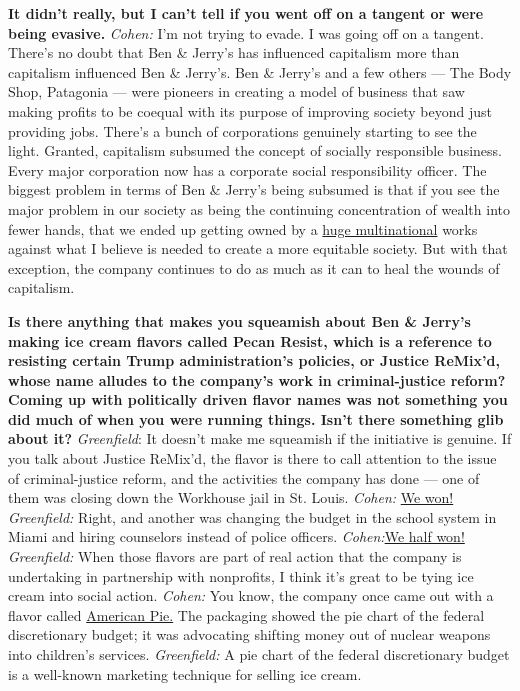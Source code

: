 \textbf{It didn't really, but I can't tell if you went off on a tangent
or were being evasive.} \emph{Cohen:} I'm not trying to evade. I was
going off on a tangent. There's no doubt that Ben \& Jerry's has
influenced capitalism more than capitalism influenced Ben \& Jerry's.
Ben \& Jerry's and a few others --- The Body Shop, Patagonia --- were
pioneers in creating a model of business that saw making profits to be
coequal with its purpose of improving society beyond just providing
jobs. There's a bunch of corporations genuinely starting to see the
light. Granted, capitalism subsumed the concept of socially responsible
business. Every major corporation now has a corporate social
responsibility officer. The biggest problem in terms of Ben \& Jerry's
being subsumed is that if you see the major problem in our society as
being the continuing concentration of wealth into fewer hands, that we
ended up getting owned by a \href{http://nytimes.com\#tooltip-2}{huge
multinational} works against what I believe is needed to create a more
equitable society. But with that exception, the company continues to do
as much as it can to heal the wounds of capitalism.

\textbf{Is there anything that makes you squeamish about Ben \& Jerry's
making ice cream flavors called Pecan Resist, which is a reference to
resisting certain Trump administration's policies, or Justice ReMix'd,
whose name alludes to the company's work in criminal-justice reform?
Coming up with politically driven flavor names was not something you did
much of when you were running things. Isn't there something glib about
it?} \emph{Greenfield}: It doesn't make me squeamish if the initiative
is genuine. If you talk about Justice ReMix'd, the flavor is there to
call attention to the issue of criminal-justice reform, and the
activities the company has done --- one of them was closing down the
Workhouse jail in St. Louis. \emph{Cohen:}
\href{http://nytimes.com\#tooltip-3}{We won!} \emph{Greenfield:} Right,
and another was changing the budget in the school system in Miami and
hiring counselors instead of police officers.
\emph{Cohen:}\href{http://nytimes.com\#tooltip-4}{We half won!}
\emph{Greenfield:} When those flavors are part of real action that the
company is undertaking in partnership with nonprofits, I think it's
great to be tying ice cream into social action. \emph{Cohen:} You know,
the company once came out with a flavor called
\href{http://nytimes.com\#tooltip-5}{American Pie.} The packaging showed
the pie chart of the federal discretionary budget; it was advocating
shifting money out of nuclear weapons into children's services.
\emph{Greenfield:} A pie chart of the federal discretionary budget is a
well-known marketing technique for selling ice cream.

